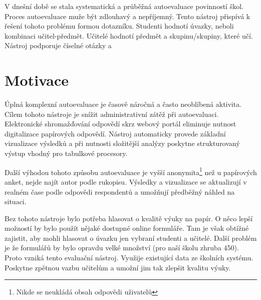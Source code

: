 V dnešní době se stala systematická a průběžná autoevaluace povinností škol.
Proces autoevaluace muže být zdlouhavý a nepříjemný.\cite{sbornik-autoevaluace} 
Tento nástroj přispívá k řešení tohoto problému formou dotazníku.
Studenti hodnotí úvazky, neboli kombinaci učitel-předmět. 
Učitelé hodnotí předmět a skupinu/skupiny, které učí. 
Nástroj podporuje číselné otázky a 

\section{Motivace}
Úplná komplexní autoevaluace je časově náročná a často neoblíbená aktivita.\cite{sbornik-autoevaluace}
Cílem tohoto nástroje je snížit administrativní zátěž při autoevaluaci.
Elektronické shromažďování odpovědí skrz webový portál eliminuje nutnost digitalizace papírových odpovědí. 
Nástroj automaticky provede základní vizualizace výsledků a při nutnosti složitější analýzy poskytne strukturovaný výstup vhodný pro tabulkové procesory.

Další výhodou tohoto způsobu autoevaluace je vyšší anonymita\footnote{Nikde se neukládá obsah odpovědi uživatelů} než u papírových anket, nejde najít autor podle rukopisu.  
Výsledky a vizualizace se aktualizují v realném čase podle odpovědi respondentů a umožňují předběžný náhled na situaci.



Bez tohoto nástroje bylo potřeba hlasovat o kvalitě výuky na papír.
O něco lepší možností by bylo použít nějaké dostupné online formuláře.
Tam je však obtížné zajistit, aby mohli hlasovat o úvazku jen vybraní studenti a učitelé.
Další problém je že formulářů by bylo opravdu velké množství (pro naší školu zhruba 450).
Proto vzniká tento evaluační nástroj.
Využije existující data ze školních systému.
Poskytne zpětnou vazbu učitelům a umožní jim tak zlepšit kvalitu výuky.
